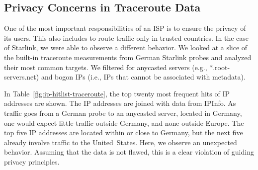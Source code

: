\subsection{Privacy Concerns in Traceroute Data}

One of the most important responsibilities of an \ac{ISP} is to ensure the privacy of its users. This also includes to route traffic only in trusted countries. In the case of Starlink, we were able to observe a different behavior. We looked at a slice of the built-in traceroute measurements from German Starlink probes and analyzed their most common targets. We filtered for anycasted servers (e.g., *.root-servers.net) and bogon IPs (i.e., IPs that cannot be associated with metadata).



In Table~\ref{fig:ip-hitlist-traceroute}, the top twenty most frequent hits of IP addresses are shown. The IP addresses are joined with data from IPInfo. As traffic goes from a German probe to an anycasted server, located in Germany, one would expect little traffic outside Germany, and none outside Europe. The top five IP addresses are located within or close to Germany, but the next five already involve traffic to the United~States. Here, we observe an unexpected behavior. Assuming that the data is not flawed, this is a clear violation of guiding privacy principles.



